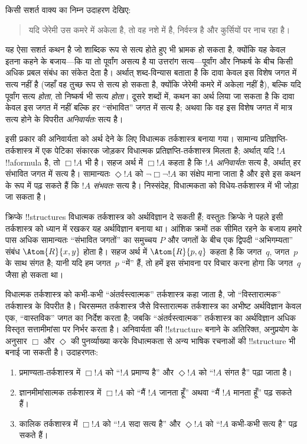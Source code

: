 \documentclass[../../../include/open-logic-section]{subfiles}
\begin{document}


किसी सशर्त वाक्य का निम्न उदाहरण देखिए:
\begin{quote}
  यदि जेरेमी उस कमरे में अकेला है, तो वह नशे में है, निर्वस्त्र है और
  कुर्सियों पर नाच रहा है।
\end{quote}
यह ऐसा सशर्त कथन है जो शाब्दिक रूप से सत्य होते हुए भी भ्रामक हो सकता
है, क्योंकि यह केवल इतना कहने के बजाय---कि या तो पूर्वांग असत्य है या
उत्तरांग सत्य---पूर्वांग और निष्कर्ष के बीच किसी अधिक प्रबल संबंध का संकेत
देता है। अर्थात् शब्द-विन्यास बताता है कि दावा केवल इस विशेष जगत में सत्य
नहीं है (जहाँ वह तुच्छ रूप से सत्य हो सकता है, क्योंकि जेरेमी कमरे में
अकेला नहीं है), बल्कि यदि पूर्वांग सत्य \emph{होता}, तो निष्कर्ष भी सत्य
\emph{होता}। दूसरे शब्दों में, कथन का अर्थ लिया जा सकता है कि दावा केवल इस
जगत में नहीं बल्कि हर ``संभावित'' जगत में सत्य है; अथवा कि वह इस विशेष जगत
में मात्र सत्य होने के विपरीत \emph{अनिवार्यतः} सत्य है।

इसी प्रकार की अनिवार्यता को अर्थ देने के लिए विधात्मक तर्कशास्त्र बनाया गया।
सामान्य प्रतिज्ञप्ति-तर्कशास्त्र में एक पेटिका संकारक जोड़कर विधात्मक
प्रतिज्ञप्ति-तर्कशास्त्र मिलता है; अर्थात् यदि $!A$ !!a{formula} है, तो
$\Box !A$ भी है। सहज अर्थ में $\Box !A$ कहता है कि $!A$ \emph{अनिवार्यतः}
सत्य है, अर्थात् हर संभावित जगत में सत्य है। सामान्यतः $\Diamond !A$ को
$\lnot \Box \lnot !A$ का संक्षेप माना जाता है और इसे इस कथन के रूप में पढ़
सकते हैं कि $!A$ \emph{संभवतः} सत्य है। निस्संदेह, विधात्मकता को
विधेय-तर्कशास्त्र में भी जोड़ा जा सकता है।

क्रिप्के !!{structure}s विधात्मक तर्कशास्त्र को अर्थविज्ञान दे सकती हैं;
वस्तुतः क्रिप्के ने पहले इसी तर्कशास्त्र को ध्यान
में रखकर यह अर्थविज्ञान बनाया था। आंशिक क्रमों तक सीमित रहने के बजाय हमारे
पास अधिक सामान्यतः ``संभावित जगतों'' का समुच्चय $P$ और जगतों के बीच एक
द्विपदी ``अभिगम्यता'' संबंध $\Atom{R}{x,y}$ होता है। सहज अर्थ में
$\Atom{R}{p,q}$ कहता है कि जगत~$q$, जगत~$p$ के साथ संगत है; यानी यदि हम
जगत~$p$ ``में'' हैं, तो हमें इस संभावना पर विचार करना होगा कि जगत~$q$ जैसा
हो सकता था।

विधात्मक तर्कशास्त्र को कभी-कभी ``अंतर्वस्त्वात्मक'' तर्कशास्त्र कहा जाता
है, जो ``विस्तारात्मक'' तर्कशास्त्र के विपरीत है। चिरसम्मत तर्कशास्त्र जैसे
विस्तारात्मक तर्कशास्त्र का अभीष्ट अर्थविज्ञान केवल एक, ``वास्तविक'' जगत का
निर्देश करता है; जबकि ``अंतर्वस्त्वात्मक'' तर्कशास्त्र का अर्थविज्ञान अधिक
विस्तृत सत्तामीमांसा पर निर्भर करता है। अनिवार्यता की !!{structure} बनाने
के अतिरिक्त, अनुप्रयोग के अनुसार $\Box$ और $\Diamond$ की पुनर्व्याख्या
करके विधात्मकता से अन्य भाषिक रचनाओं की !!{structure} भी बनाई जा सकती है।
उदाहरणतः:
\begin{enumerate}
\item प्रमाण्यता-तर्कशास्त्र में $\Box !A$ को ``$!A$ प्रमाण्य है'' और
  $\Diamond !A$ को ``$!A$ संगत है'' पढ़ा जाता है।
\item ज्ञानमीमांसात्मक तर्कशास्त्र में $\Box !A$ को ``मैं $!A$ जानता हूँ''
  अथवा ``मैं $!A$ मानता हूँ'' पढ़ सकते हैं।
\item कालिक तर्कशास्त्र में $\Box !A$ को ``$!A$ सदा सत्य है'' और
  $\Diamond !A$ को ``$!A$ कभी-कभी सत्य है'' पढ़ सकते हैं।
\end{enumerate}
\end{document}
